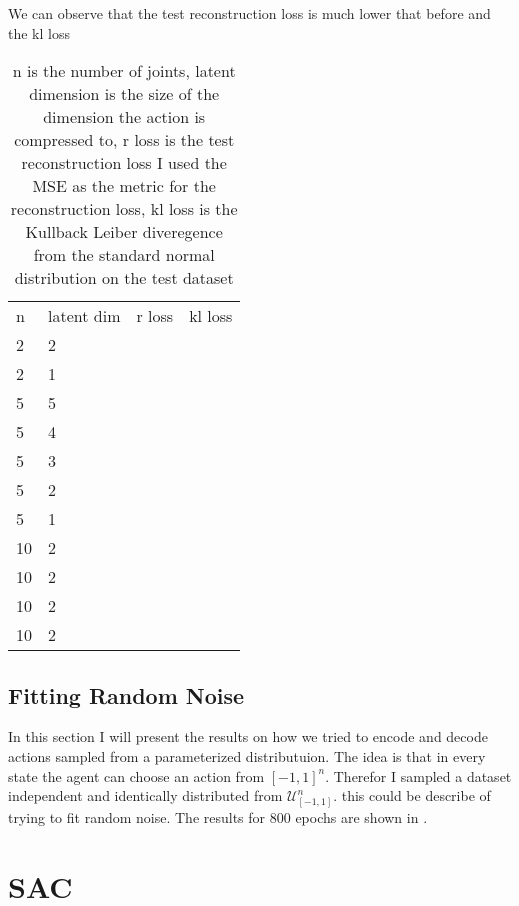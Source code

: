 We can observe that the test reconstruction loss is much lower that before and the kl loss

\begin{table}[]
    \centering
    \begin{tabular}{l|l|r|r}
         n & latent dim & r loss & kl loss\\
         2 & 2 & & \\
         2 & 1 & & \\
         5 & 5 & & \\
         5 & 4 & & \\
         5 & 3 & & \\
         5 & 2 & & \\
         5 & 1 & & \\
         10 & 2 & & \\
         10 & 2 & & \\
         10 & 2 & & \\
         10 & 2 & & \\
    \end{tabular}
    \caption{n is the number of joints, latent dimension is the size of the dimension the action is compressed to, r loss is the test reconstruction loss I used the MSE as the metric for the reconstruction loss, kl loss is the Kullback Leiber diveregence from the standard normal distribution on the test dataset}
    \label{tab:CVAE results}
\end{table}

\subsection{Fitting Random Noise}

In this section I will present the results on how we tried to encode and decode actions sampled from a parameterized distributuion.
The idea is that in every state the agent can choose an action from $[-1, 1]^n$. Therefor I sampled a dataset independent and identically distributed from $\mathcal{U}^n_{[-1, 1]}$. this could be describe of trying to fit random noise.
The results for 800 epochs are shown in \figref{}.


\section{SAC}

